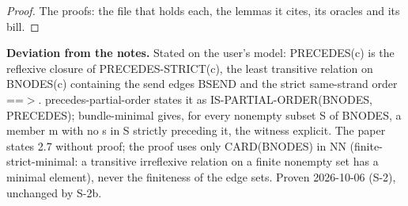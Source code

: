 \begin{proof}
%
The proofs: the file that holds each, the lemmas it cites, its oracles and its bill.
%
%
%
%
%
%
%
%
%
%
%
%
%
\end{proof}
%
\noindent\textbf{Deviation from the notes.} Stated on the user's model: PRECEDES(c) is the reflexive closure of PRECEDES-STRICT(c), the least transitive relation on BNODES(c) containing the send edges BSEND and the strict same-strand order ==$>$. precedes-partial-order states it as IS-PARTIAL-ORDER(BNODES, PRECEDES); bundle-minimal gives, for every nonempty subset S of BNODES, a member m with no s in S strictly preceding it, the witness explicit. The paper states 2.7 without proof; the proof uses only CARD(BNODES) in NN (finite-strict-minimal: a transitive irreflexive relation on a finite nonempty set has a minimal element), never the finiteness of the edge sets. Proven 2026-10-06 (S-2), unchanged by S-2b.
%
\renewcommand{\thethm}{2.8}
